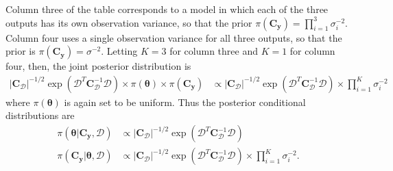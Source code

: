 \documentclass{article}
\begin{document}
\begin{appendices}
Column three of the table corresponds to a model in which each of the three outputs has its own observation variance, so that the prior $\pi(\mathbf C_{\mathbf y})=\prod_{i=1}^3 \sigma^{-2}_i$. 
Column four uses a single observation variance for all three outputs, so that the prior is $\pi(\mathbf C_{\mathbf y})=\sigma^{-2}$. 
Letting $K=3$ for column three and $K=1$ for column four, then, the joint posterior distribution is
\begin{equation}\label{eq:fduprp}
\begin{aligned}
\lvert \mathbf C_{\mathcal D} \rvert ^{-1/2} \exp (\mathcal D^T \mathbf C_{\mathcal D}^{-1}\mathcal D) \times \pi(\boldsymbol \theta) \times \pi(\mathbf C_{\mathbf y}) 
&\propto\lvert \mathbf C_{\mathcal D} \rvert ^{-1/2} \exp (\mathcal D^T \mathbf C_{\mathcal D}^{-1}\mathcal D) \times \prod_{i=1}^K \sigma^{-2}_i
\end{aligned}
\end{equation}
where $\pi(\boldsymbol\theta)$ is again set to be uniform.
Thus the posterior conditional distributions are
\begin{equation}\label{eq:cduprp}
\begin{aligned}
\pi(\boldsymbol\theta|\mathbf C_{\mathbf y},\mathcal D) &\propto
\lvert \mathbf C_{\mathcal D} \rvert ^{-1/2} \exp (\mathcal D^T \mathbf C_{\mathcal D}^{-1}\mathcal D) \\
\pi(\mathbf C_{\mathbf y}| \boldsymbol \theta ,\mathcal D) &\propto
\lvert \mathbf C_{\mathcal D} \rvert ^{-1/2} \exp (\mathcal D^T \mathbf C_{\mathcal D}^{-1}\mathcal D) \times \prod_{i=1}^K \sigma^{-2}_i.
\end{aligned}
\end{equation}


\end{appendices}
\end{document}
